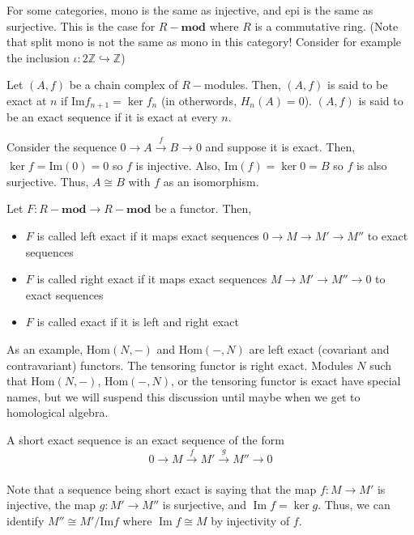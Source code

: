\documentclass[12pt,reqno]{amsart}
\numberwithin{theorem}{section}
\theoremstyle{definition}
\theoremstyle{remark}
\numberwithin{equation}{section}
\newcommand{\Z}{\mathbb Z}
\newcommand{\im}{\operatorname{Im}}
\renewcommand{\Im}{\text{Im}}
\theoremstyle{definition}
\renewcommand{\hom}{\mathrm{Hom}}
\begin{document}
For some categories, mono is the same as injective, and epi is the same as surjective. This is the case for $R-\mathbf{mod}$ where $R$ is a commutative ring. (Note that split mono is not the same as mono in this category! Consider for example the inclusion $\iota :2\Z \hookrightarrow \Z$)
\begin{definition}
    Let $(A,f)$ be a chain complex of $R-$modules. Then, $(A,f)$ is said to be exact at $n$ if $\Im f_{n+1}=\ker f_n$ (in otherwords, $H_n(A) = 0$). $(A,f)$ is said to be an exact sequence if it is exact at every $n$.
\end{definition}
\begin{example}
    Consider the sequence $0\rightarrow A \xrightarrow[]{f}B\rightarrow 0$ and suppose it is exact. Then, $\ker f = \Im(0) = 0$ so $f$ is injective. Also, $\Im(f) = \ker 0 = B$ so $f$ is also surjective. Thus, $A\cong B$ with $f$ as an isomorphism.
\end{example}
\begin{definition}
    Let $F:R-\mathbf {mod}\rightarrow R-\mathbf {mod}$ be a functor. Then, 
    \begin{itemize}
        \item $F$ is called left exact if it maps exact sequences $0 \rightarrow M\rightarrow M'\rightarrow M''$ to exact sequences
        \item $F$ is called right exact if it maps exact sequences $M\rightarrow M'\rightarrow M'' \rightarrow 0$ to exact sequences
        \item $F$ is called exact if it is left and right exact
    \end{itemize}
\end{definition}
\begin{example}
    As an example, $\hom(N,-)$ and $\hom(-,N)$ are left exact (covariant and contravariant) functors. The tensoring functor is right exact. Modules $N$ such that $\hom(N,-)$, $\hom(-,N)$, or the tensoring functor is exact have special names, but we will suspend this discussion until maybe when we get to homological algebra.
\end{example}
\begin{definition}
    A short exact sequence is an exact sequence of the form
    $$0 \rightarrow M \xrightarrow[]{f}M'\xrightarrow[]{g}M''\rightarrow 0 $$
\end{definition}
Note that a sequence being short exact is saying that the map $f:M\rightarrow M'$ is injective, the map $g:M'\rightarrow M''$ is surjective, and $\im f = \ker g$. Thus, we can identify $M'' \cong M'/\Im f$ where $\im f \cong M$ by injectivity of $f$.
\end{document}
